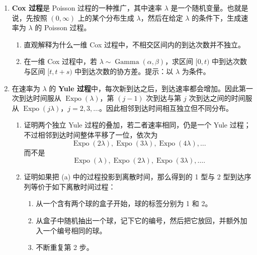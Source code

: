 \documentclass[UTF8,12pt,a4paper,fontset=fandol]{ctexart}
\begin{document}
\begin{enumerate}
\begin{enumerate}
    \item 假设有一个速率函数为 $\lambda(t)$ 的非齐次 Poisson 过程。令
    $N(t)$ 为截至时刻 $t$ 的到达次数，令 $T_j$ 为第 $j$ 次到达时刻。解释为什么 $N(t)$ 与 $T_1,\ldots,T_{N(t)}$ 的混合联合 PDF，即截至时刻 $t$ 观察到的所有数据，为
    \[
      f(n,t_1,\ldots,t_n)
      =
      \frac{e^{-\lambda_{\text{total}}}\lambda_{\text{total}}^n}{n!}
      \cdot n!\cdot
      \frac{\lambda(t_1)\cdots\lambda(t_n)}{\lambda_{\text{total}}^n}
      =
      e^{-\lambda_{\text{total}}}\lambda(t_1)\cdots\lambda(t_n),
    \]
    其中 $0<t_1<t_2<\cdots<t_n$，$n$ 为非负整数，且
    \[
      \lambda_{\text{total}}=\int_0^t\lambda(u)\,du.
    \]
  \end{enumerate}

  \item \textbf{Cox 过程}是 Poisson 过程的一种推广，其中速率 $\lambda$ 是一个随机变量。也就是说，先按照 $(0,\infty)$ 上的某个分布生成 $\lambda$，然后在给定 $\lambda$ 的条件下，生成速率为 $\lambda$ 的 Poisson 过程。
  \begin{enumerate}
    \item 直观解释为什么一维 Cox 过程中，不相交区间内的到达次数并不独立。
    \item 在一维 Cox 过程中，若 $\lambda\sim\operatorname{Gamma}(\alpha,\beta)$，求区间 $[0,t)$ 中到达次数与区间 $[t,t+s)$ 中到达次数的协方差。提示：以 $\lambda$ 为条件。
  \end{enumerate}

  \item 在速率为 $\lambda$ 的 \textbf{Yule 过程}中，每次新到达之后，到达速率都会增加。因此第一次到达时间服从 $\operatorname{Expo}(\lambda)$，第 $(j-1)$ 次到达与第 $j$ 次到达之间的时间服从 $\operatorname{Expo}(j\lambda)$，$j=2,3,\ldots$。因此相邻到达时间相互独立但不同分布。
  \begin{enumerate}
    \item 证明两个独立 Yule 过程的叠加，若二者速率相同，仍是一个 Yule 过程；不过相邻到达时间整体平移了一位，依次为
    \[
      \operatorname{Expo}(2\lambda),\operatorname{Expo}(3\lambda),
      \operatorname{Expo}(4\lambda),\ldots
    \]
    而不是
    \[
      \operatorname{Expo}(\lambda),\operatorname{Expo}(2\lambda),
      \operatorname{Expo}(3\lambda),\ldots.
    \]

    \item 证明如果把 (a) 中的过程投影到离散时间，那么得到的 1 型与 2 型到达序列等价于如下离散时间过程：
    \begin{enumerate}
      \item 从一个含有两个球的盒子开始，球的标签分别为 1 和 2。
      \item 从盒子中随机抽出一个球，记下它的编号，然后把它放回，并额外加入一个编号相同的球。
      \item 不断重复第 2 步。
    \end{enumerate}
  \end{enumerate}


\end{enumerate}
\end{document}
